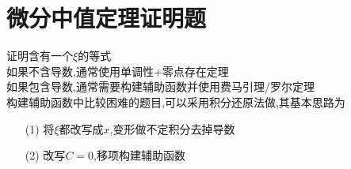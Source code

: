 \documentclass[12pt, a4paper, oneside, UTF8]{ctexbook}
\begin{document}
\section{微分中值定理证明题}

\begin{remark}证明含有一个$\xi$的等式 \\
    如果不含导数,通常使用单调性+零点存在定理 \\
    如果包含导数,通常需要构建辅助函数并使用费马引理/罗尔定理 \\
    构建辅助函数中比较困难的题目,可以采用积分还原法做,其基本思路为 
    \begin{enumerate}
        \item [(1)] 将$\xi$都改写成$x$,变形做不定积分去掉导数
        \item [(2)] 改写$C=0$,移项构建辅助函数
    \end{enumerate}
\end{remark}
\end{document}
